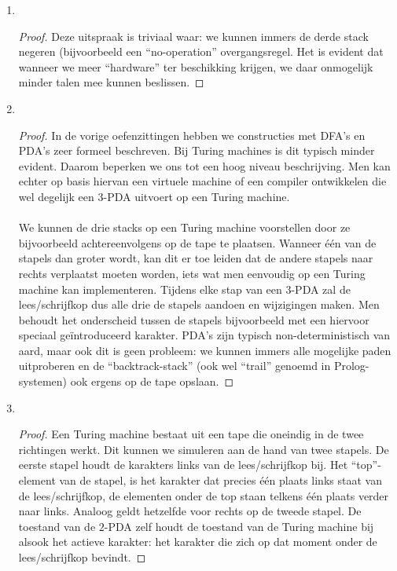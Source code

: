 \documentclass[a4paper]{article}
\begin{document}
\begin{answer}
\begin{enumerate}
 \begin{enumerate}
 \item ~~
 \begin{proof}
 Deze uitspraak is triviaal waar: we kunnen immers de derde stack negeren (bijvoorbeeld een ``no-operation'' overgangsregel. Het is evident dat wanneer we meer ``hardware'' ter beschikking krijgen, we daar onmogelijk minder talen mee kunnen beslissen.
 \end{proof}
 \item ~~
 \begin{proof}
 In de vorige oefenzittingen hebben we constructies met DFA's en PDA's zeer formeel beschreven. Bij Turing machines is dit typisch minder evident. Daarom beperken we ons tot een hoog niveau beschrijving. Men kan echter op basis hiervan een virtuele machine of een compiler ontwikkelen die wel degelijk een $3$-PDA uitvoert op een Turing machine.
 \paragraph{}
 We kunnen de drie stacks op een Turing machine voorstellen door ze bijvoorbeeld achtereenvolgens op de tape te plaatsen. Wanneer \'e\'en van de stapels dan groter wordt, kan dit er toe leiden dat de andere stapels naar rechts verplaatst moeten worden, iets wat men eenvoudig op een Turing machine kan implementeren. Tijdens elke stap van een $3$-PDA zal de lees/schrijfkop dus alle drie de stapels aandoen en wijzigingen maken. Men behoudt het onderscheid tussen de stapels bijvoorbeeld met een hiervoor speciaal ge\"introduceerd karakter. PDA's zijn typisch non-deterministisch van aard, maar ook dit is geen probleem: we kunnen immers alle mogelijke paden uitproberen en de ``backtrack-stack'' (ook wel ``trail'' genoemd in Prolog-systemen) ook ergens op de tape opslaan.
 \end{proof}
 \item ~~
 \begin{proof}
Een Turing machine bestaat uit een tape die oneindig in de twee richtingen werkt. Dit kunnen we simuleren aan de hand van twee stapels. De eerste stapel houdt de karakters links van de lees/schrijfkop bij. Het ``top''-element van de stapel, is het karakter dat precies \'e\'en plaats links staat van de lees/schrijfkop, de elementen onder de top staan telkens \'e\'en plaats verder naar links. Analoog geldt hetzelfde voor rechts op de tweede stapel. De toestand van de $2$-PDA zelf houdt de toestand van de Turing machine bij alsook het actieve karakter: het karakter die zich op dat moment onder de lees/schrijfkop bevindt.

\end{proof}
\end{enumerate}
\end{enumerate}
\end{answer}
\end{document}

